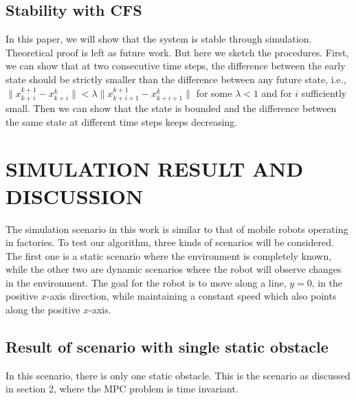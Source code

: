 \documentclass[letterpaper, 10 pt, conference]{ieeeconf}  %
\begin{document}
\subsection{Stability with CFS}
In this paper, we will show that the system is stable through simulation. Theoretical proof is left as future work. But here we sketch the procedures. First, we can show that at two consecutive time steps, the difference between the early state should be strictly smaller than the difference between any future state, i.e., $\|x_{k+i}^{k+1}-x_{k+i}^k\|<\lambda\|x_{k+i+1}^{k+1}-x_{k+i+1}^k\|$ for some $\lambda<1$ and for $i$ sufficiently small. Then we can show that the state is bounded and the difference between the same state at different time steps keeps decreasing.
%
%


\section{SIMULATION RESULT AND DISCUSSION}
The simulation scenario in this work is similar to that of mobile robots operating in factories. To test our algorithm, three kinds of scenarios will be considered. The first one is a static scenario where the environment  is completely known, while the other two are dynamic scenarios where the robot will observe changes in the environment.
The goal for the robot is to move along a line, $y=0$, in the positive $x$-axis direction, while maintaining a constant speed which also points along the positive $x$-axis. 


\subsection{Result of scenario with single static obstacle}
In this scenario, there is only one static obstacle. This is the scenario as discussed in section 2, where the MPC problem is time invariant. 
\end{document}
